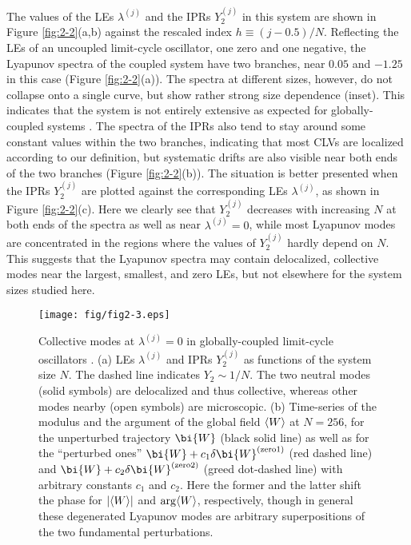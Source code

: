 \documentclass[12pt]{iopart}
\begin{document}
The values of the LEs $\lambda^{(j)}$ and the IPRs $Y_2^{(j)}$
 in this system are shown in Figure \ref{fig:2-2}(a,b)
 against the rescaled index $h \equiv (j-0.5)/N$.
Reflecting the LEs of an uncoupled limit-cycle oscillator,
 one zero and one negative, the Lyapunov spectra of the coupled system
 have two branches, near $0.05$ and $-1.25$ in this case
 (Figure \ref{fig:2-2}(a)).
The spectra at different sizes, however, do not collapse
 onto a single curve, but show rather strong size dependence (inset).
This indicates that the system is not entirely extensive
 as expected for globally-coupled systems \cite{Takeuchi.etal-PRL2011}.
The spectra of the IPRs also tend to stay around some constant values
 within the two branches, indicating that most CLVs are localized
 according to our definition, but systematic drifts are also visible
 near both ends of the two branches (Figure \ref{fig:2-2}(b)).
The situation is better presented when the IPRs $Y_2^{(j)}$
 are plotted against the corresponding LEs $\lambda^{(j)}$,
 as shown in Figure \ref{fig:2-2}(c).
Here we clearly see that $Y_2^{(j)}$ decreases with increasing $N$
 at both ends of the spectra as well as near $\lambda^{(j)}=0$,
 while most Lyapunov modes are concentrated in the regions
 where the values of $Y_2^{(j)}$ hardly depend on $N$.
This suggests that the Lyapunov spectra may contain
 delocalized, collective modes near the largest, smallest, and zero LEs,
 but not elsewhere for the system sizes studied here.

\begin{figure}[t]
 \begin{center}
  \texttt{[image: fig/fig2-3.eps]}
  \caption{Collective modes at $\lambda^{(j)} = 0$ in globally-coupled limit-cycle oscillators . (a) LEs $\lambda^{(j)}$ and IPRs $Y_2^{(j)}$ as functions of the system size $N$. The dashed line indicates $Y_2 \sim 1/N$. The two neutral modes (solid symbols) are delocalized and thus collective, whereas other modes nearby (open symbols) are microscopic. (b) Time-series of the modulus and the argument of the global field $\langle W \rangle$ at $N=256$, for the unperturbed trajectory $\bi{W}$ (black solid line) as well as for the ``perturbed ones'' $\bi{W}+c_1\delta\bi{W}^{\mathrm{(zero1)}}$ (red dashed line) and $\bi{W}+c_2\delta\bi{W}^{\mathrm{(zero2)}}$ (greed dot-dashed line) with arbitrary constants $c_1$ and $c_2$. Here the former and the latter shift the phase for $|\langle W \rangle|$ and $\arg\langle W \rangle$, respectively, though in general these degenerated Lyapunov modes are arbitrary superpositions of the two fundamental perturbations.}
  \label{fig:2-3}
 \end{center}
\end{figure}%
\end{document}
